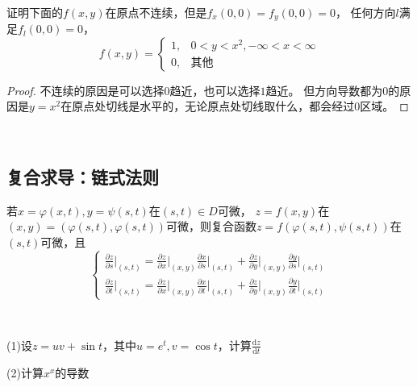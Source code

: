 ~


\begin{exercise}
  证明下面的$f(x,y)$在原点不连续，但是$f_x(0,0) = f_y(0,0) = 0$，
  任何方向$l$满足$f_l(0,0) = 0$，
  \begin{equation*}
    f(x,y) =
    \begin{cases}
      1, & 0 < y < x^2 , -\infty < x < \infty\\
      0, &\text{其他}
    \end{cases}
  \end{equation*}
\end{exercise}

\begin{proof}
  不连续的原因是可以选择$0$趋近，也可以选择$1$趋近。
  但方向导数都为$0$的原因是$y = x^2$在原点处切线是水平的，无论原点处切线取什么，都会经过$0$区域。
\end{proof}


~
\subsection{复合求导：链式法则}

\begin{theorem}[链式法则]
  若$x = \varphi(x,t), y = \psi(s,t)$在$(s,t) \in D$可微，
  $z = f(x,y)$在$(x,y) = (\varphi(s,t), \varphi(s,t))$可微，则复合函数$z = f(\varphi(s,t), \psi(s,t))$在
  $(s,t)$可微，且
  \begin{equation*}
    \begin{cases}
      \frac{\partial z}{\partial s} \bigg|_{(s,t)} = \frac{\partial z }{\partial x} \bigg|_{(x,y)} \frac{\partial x}{\partial s}\bigg|_{(s,t)} + \frac{\partial z}{\partial y}\bigg|_{(x,y)} \frac{\partial y}{\partial s}\bigg|_{(s,t)}\\
      \frac{\partial z}{\partial t} \bigg|_{(s,t)} = \frac{\partial z }{\partial x} \bigg|_{(x,y)} \frac{\partial x}{\partial t}\bigg|_{(s,t)} + \frac{\partial z}{\partial y}\bigg|_{(x,y)} \frac{\partial y}{\partial t}\bigg|_{(s,t)}
    \end{cases}
  \end{equation*}
\end{theorem}

~

\begin{exercise}[链式法则练习]
  (1)设$z = uv + \sin t$，其中$u = e^t, v = \cos t$，计算$\frac{\mathrm{d} z}{\mathrm{d} t}$

  (2)计算$x^x$的导数
\end{exercise}

